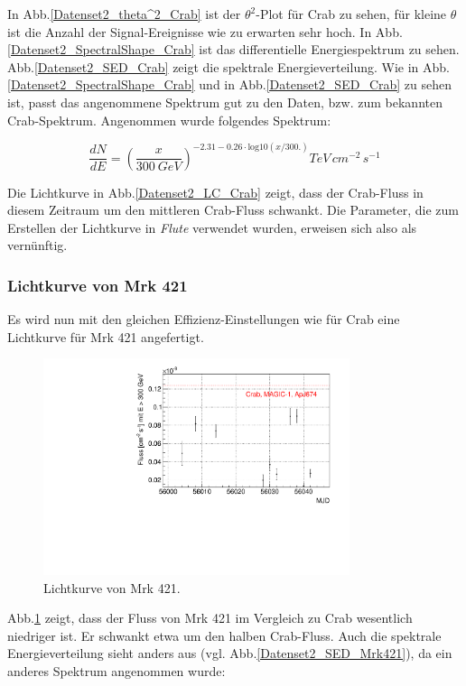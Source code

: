 In Abb.\ref{Datenset2_theta^2_Crab} ist der $\theta^2$-Plot für Crab zu sehen, für kleine $\theta$ ist die Anzahl der Signal-Ereignisse wie zu erwarten sehr hoch.
In Abb.\ref{Datenset2_SpectralShape_Crab} ist das differentielle Energiespektrum zu sehen.
Abb.\ref{Datenset2_SED_Crab} zeigt die spektrale Energieverteilung.
Wie in Abb.\ref{Datenset2_SpectralShape_Crab} und in Abb.\ref{Datenset2_SED_Crab} zu sehen ist, passt das angenommene Spektrum gut zu den Daten, bzw. zum bekannten Crab-Spektrum.
Angenommen wurde folgendes Spektrum:

\begin{equation}
\frac{dN}{dE}=\left(\frac{x}{\SI{300}{GeV}}\right)^{-2.31-0.26\cdot \text{log10}(x/300.)}\si{TeV\,cm^{-2}\,s^{-1}}
\end{equation}

Die Lichtkurve in Abb.\ref{Datenset2_LC_Crab} zeigt, dass der Crab-Fluss in diesem Zeitraum um den mittleren Crab-Fluss schwankt.
Die Parameter, die zum Erstellen der Lichtkurve in \textit{Flute} verwendet wurden, erweisen sich also als vernünftig.

\subsubsection{Lichtkurve von Mrk 421}
Es wird nun mit den gleichen Effizienz-Einstellungen wie für Crab eine Lichtkurve für Mrk 421 angefertigt.

\begin{figure}
    \centering
    \includegraphics[width=0.8\textwidth]{./Plots/04_MrkAnalyse/Datenset2/LC_Mrk421.pdf}
    \caption{Lichtkurve von Mrk 421.}
    \label{Datenset2_LC_Mrk421}
\end{figure}

Abb.\ref{Datenset2_LC_Mrk421} zeigt, dass der Fluss von Mrk 421 im Vergleich zu Crab wesentlich niedriger ist.
Er schwankt etwa um den halben Crab-Fluss.
Auch die spektrale Energieverteilung sieht anders aus (vgl. Abb.\ref{Datenset2_SED_Mrk421}), da ein anderes Spektrum angenommen wurde:

